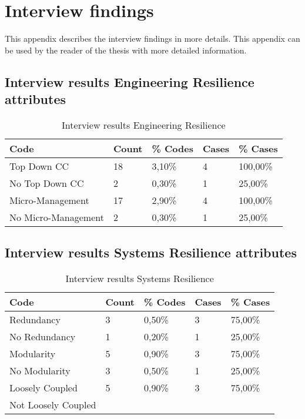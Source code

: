 \chapter{Interview findings}
\label{app:interviewfindings}
This appendix describes the interview findings in more details. This appendix can be used by the reader of the thesis with more detailed information.

\section{Interview results Engineering Resilience attributes}
\label{sec:interviewsresultsengineeringresilience}
\begin{table}[H]
	\centering
	\begin{tabular}{lllll}
		\toprule
		\textbf{Code} & \multicolumn{1}{l}{\textbf{Count}} & \multicolumn{1}{l}{\textbf{\% Codes}} & \multicolumn{1}{l}{\textbf{Cases}} & \multicolumn{1}{l}{\textbf{\% Cases}} \\
		\midrule
		Top Down CC &  18    & 3,10\% & 4     & 100,00\% \\
		No Top Down CC & 2     & 0,30\% & 1     & 25,00\% \\
		Micro-Management & 17    & 2,90\% & 4     & 100,00\% \\
		No Micro-Management & 2     & 0,30\% & 1     & 25,00\% \\
		\bottomrule
	\end{tabular}%
	\caption{Interview results Engineering Resilience}
	\label{tab:interviewresultsengineeringresilience}%
\end{table}%

\section{Interview results Systems Resilience attributes}
\label{sec:interviewresultssystemsresilience}
\begin{table}[H]
	\centering
	\begin{tabular}{lllll}
		\toprule
		\textbf{Code} & \textbf{Count} & \textbf{\% Codes} &\textbf{Cases} & \textbf{\% Cases} \\
		\midrule
		Redundancy & 3     & 0,50\% & 3     & 75,00\% \\
		No Redundancy & 1     & 0,20\% & 1     & 25,00\% \\
		Modularity & 5     & 0,90\% & 3     & 75,00\% \\
		No Modularity & 3     & 0,50\% & 1     & 25,00\% \\
		Loosely Coupled & 5     & 0,90\% & 3     & 75,00\% \\
		Not Loosely Coupled &       &       &       &  \\
		\bottomrule
	\end{tabular}%
		\caption{Interview results Systems Resilience}%
	\label{tab:interviewresults Systems Resilience}%
\end{table}%

